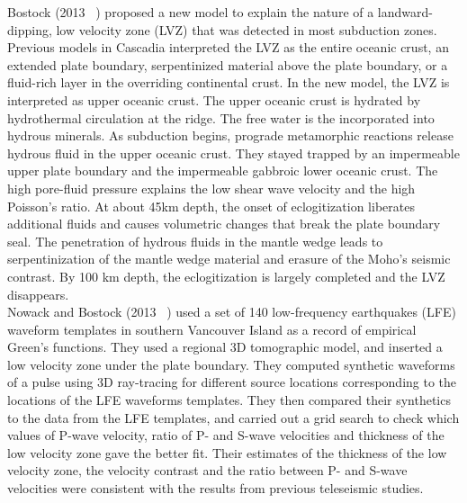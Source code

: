 \documentclass[main.tex]{subfiles}
\begin{document}
Bostock (2013 ~\cite{BOS_2013}) proposed a new model to explain the nature of a landward-dipping, low velocity zone (LVZ) that was detected in most subduction zones. Previous models in Cascadia interpreted the LVZ as the entire oceanic crust, an extended plate boundary, serpentinized material above the plate boundary, or a fluid-rich layer in the overriding continental crust. In the new model, the LVZ is interpreted as upper oceanic crust. The upper oceanic crust is hydrated by hydrothermal circulation at the ridge. The free water is the incorporated into hydrous minerals. As subduction begins, prograde metamorphic reactions release hydrous fluid in the upper oceanic crust. They stayed trapped by an impermeable upper plate boundary and the impermeable gabbroic lower oceanic crust. The high pore-fluid pressure explains the low shear wave velocity and the high Poisson's ratio. At about 45km depth, the onset of eclogitization liberates additional fluids and causes volumetric changes that break the plate boundary seal. The penetration of hydrous fluids in the mantle wedge leads to serpentinization of the mantle wedge material and erasure of the Moho's seismic contrast. By 100 km depth, the eclogitization is largely completed and the LVZ disappears. \\

Nowack and Bostock (2013 ~\cite{NOW_2013}) used a set of 140 low-frequency earthquakes (LFE) waveform templates in southern Vancouver Island as a record of empirical Green's functions. They used a regional 3D tomographic model, and inserted a low velocity zone under the plate boundary. They computed synthetic waveforms of a pulse using 3D ray-tracing for different source locations corresponding to the locations of the LFE waveforms templates. They then compared their synthetics to the data from the LFE templates, and carried out a grid search to check which values of P-wave velocity, ratio of P- and S-wave velocities and thickness of the low velocity zone gave the better fit. Their estimates of the thickness of the low velocity zone, the velocity contrast and the ratio between P- and S-wave velocities were consistent with the results from previous teleseismic studies. \\
\end{document}
